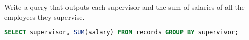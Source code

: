 \question Write a query that outputs each supervisor and the sum of salaries of all the employees they supervise.
\begin{solution}[2cm]
\begin{lstlisting}[language=SQL]
SELECT supervisor, SUM(salary) FROM records GROUP BY supervivor;
\end{lstlisting}
\end{solution}
